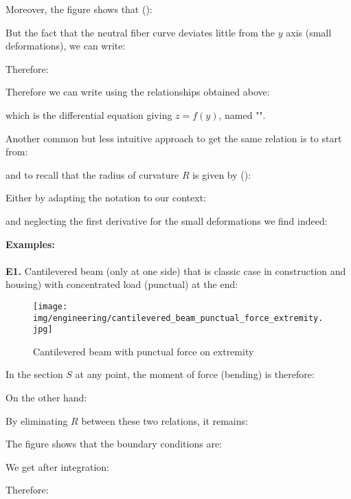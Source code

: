 	Moreover, the figure shows that ():
	
	But the fact that the neutral fiber curve deviates little from the $y$ axis (small deformations), we can write:
	
	Therefore:
	
	Therefore we can write using the relationships obtained above:
	
	which is the differential equation giving $z=f(y)$, named "".
	
	Another common but less intuitive approach to get the same relation is to start from:
	
	and to recall that the radius of curvature $R$ is given by ():
	
	Either by adapting the notation to our context:
	
	and neglecting the first derivative for the small deformations we find indeed:
	
	
	\pagebreak
	\begin{tcolorbox}[colframe=black,colback=white,sharp corners]
	\textbf{{\Large {}}Examples:}\\\\
	\textbf{E1.} Cantilevered beam (only at one side) that is classic case in construction and housing) with concentrated load (punctual) at the end:
	\begin{figure}[H]
		\centering
		\texttt{[image: img/engineering/cantilevered\_beam\_punctual\_force\_extremity.jpg]}
		\caption{Cantilevered beam with punctual force on extremity}
	\end{figure}
	In the section $S$ at any point, the moment of force (bending) is therefore:
	
	On the other hand:
	
	By eliminating $R$ between these two relations, it remains:
	
	The figure shows that the boundary conditions are:
	
	We get after integration:
	
	Therefore:
	
	\end{tcolorbox}
	
